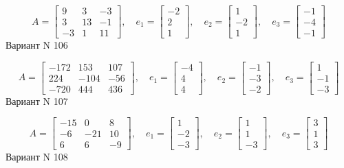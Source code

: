 \documentclass[11pt]{report}
\begin{document}
$$A = \left[\begin{matrix}9 & 3 & -3\\3 & 13 & -1\\-3 & 1 & 11\end{matrix}\right],\quad e_1 = \left[\begin{matrix}-2\\2\\1\end{matrix}\right],\quad e_2 = \left[\begin{matrix}1\\-2\\1\end{matrix}\right],\quad e_3 = \left[\begin{matrix}-1\\-4\\-1\end{matrix}\right]$$Вариант N 106

$$A = \left[\begin{matrix}-172 & 153 & 107\\224 & -104 & -56\\-720 & 444 & 436\end{matrix}\right],\quad e_1 = \left[\begin{matrix}-4\\4\\4\end{matrix}\right],\quad e_2 = \left[\begin{matrix}-1\\-3\\-2\end{matrix}\right],\quad e_3 = \left[\begin{matrix}1\\-1\\-3\end{matrix}\right]$$Вариант N 107

$$A = \left[\begin{matrix}-15 & 0 & 8\\-6 & -21 & 10\\6 & 6 & -9\end{matrix}\right],\quad e_1 = \left[\begin{matrix}1\\-2\\-3\end{matrix}\right],\quad e_2 = \left[\begin{matrix}1\\1\\-3\end{matrix}\right],\quad e_3 = \left[\begin{matrix}3\\1\\3\end{matrix}\right]$$Вариант N 108
\end{document}
